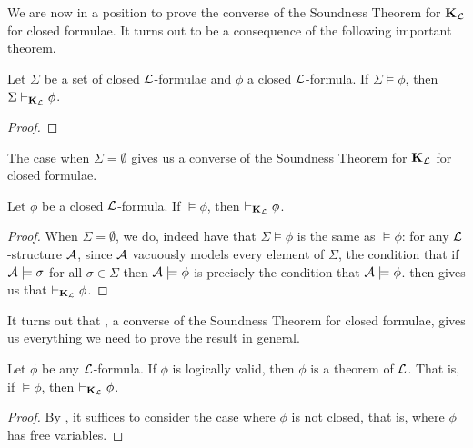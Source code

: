 We are now in a position to prove the converse of the Soundness Theorem for $\mathbf{K}_{\mathcal{L}}$ for closed formulae. It turns out to be a consequence of the following important theorem.

\begin{boxtheorem}\label{Ch2:Thm:Generalised_KLCompleteness_Closed_Formulae}
    Let $\Sigma$ be a set of closed $\mathcal{L}$-formulae and $\phi$ a closed $\mathcal{L}$-formula. If $\Sigma \models \phi$, then $\Sigma \vdash_{\mathbf{K}_{\mathcal{L}}} \phi$.
\end{boxtheorem}
\begin{proof}
    \sorry
\end{proof}

The case when $\Sigma = \emptyset$ gives us a converse of the Soundness Theorem for $\mathbf{K}_{\mathcal{L}}$ for closed formulae.

\begin{boxcorollary}\label{Ch2:Cor:KLCompleteness_Closed_Formulae}
    Let $\phi$ be a closed $\mathcal{L}$-formula. If $\models \phi$, then $\vdash_{\mathbf{K}_{\mathcal{L}}} \phi$.
\end{boxcorollary}
\begin{proof}
    When $\Sigma = \emptyset$, we do, indeed have that $\Sigma \models \phi$ is the same as $\models \phi$: for any $\mathcal{L}$-structure $\mathcal{A}$, since $\mathcal{A}$ vacuously models every element of $\Sigma$, the condition that if $\mathcal{A} \models \sigma$ for all $\sigma \in \Sigma$ then $\mathcal{A} \models \phi$ is precisely the condition that $\mathcal{A} \models \phi$.  then gives us that $\vdash_{\mathbf{K}_{\mathcal{L}}} \phi$.
\end{proof}

It turns out that , a converse of the Soundness Theorem for closed formulae, gives us everything we need to prove the result in general.

\begin{boxtheorem}\label{Ch2:Thm:Godel_Completeness}
    Let $\phi$ be any $\mathcal{L}$-formula. If $\phi$ is logically valid, then $\phi$ is a theorem of $\mathcal{L}$. That is, if $\models \phi$, then $\vdash_{\mathbf{K}_{\mathcal{L}}} \phi$.
\end{boxtheorem}
\begin{proof}
    By , it suffices to consider the case where $\phi$ is not closed, that is, where $\phi$ has free variables.
    \sorry
\end{proof}
